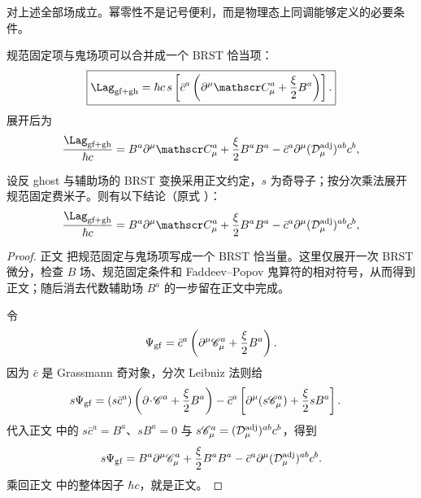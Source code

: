 对上述全部场成立。幂零性不是记号便利，而是物理态上同调能够定义的必要条件。

规范固定项与鬼场项可以合并成一个 BRST 恰当项：
\begin{equation}
 \boxed{
 \Lag_{\rm gf+gh}
 =\hbar c\,s\left[
 \bar c^a\left(\partial^\mu\mathscr C_\mu^a+\frac\xi2B^a\right)
 \right].}
 \label{eq:brst-exact-gf-dp11}
\end{equation}
展开后为
\begin{equation}
 \frac{\Lag_{\rm gf+gh}}{\hbar c}
 =B^a\partial^\mu\mathscr C_\mu^a
 +\frac\xi2B^aB^a
 -\bar c^a\partial^\mu(\mathcal D_\mu^{\rm adj})^{ab}c^b,
 \label{eq:brst-gf-expanded-dp11}
\end{equation}

\begin{proposition}
设反 ghost 与辅助场的 BRST 变换采用正文约定，$s$ 为奇导子；按分次乘法展开规范固定费米子。则有以下结论（原式 ）：
\begin{equation*}
 \frac{\Lag_{\rm gf+gh}}{\hbar c}
 =B^a\partial^\mu\mathscr C_\mu^a
 +\frac\xi2B^aB^a
 -\bar c^a\partial^\mu(\mathcal D_\mu^{\rm adj})^{ab}c^b,
\end{equation*}
\end{proposition}
\begin{proof}
正文 把规范固定与鬼场项写成一个 BRST 恰当量。这里仅展开一次 BRST 微分，检查 $B$ 场、规范固定条件和 Faddeev--Popov 鬼算符的相对符号，从而得到正文；随后消去代数辅助场 $B^a$ 的一步留在正文中完成。

令
\begin{equation*}
 \Psi_{\rm gf}
 =\bar c^a\left(\partial^\mu\mathscr C_\mu^a+\frac\xi2B^a\right).
\end{equation*}
因为 $\bar c$ 是 Grassmann 奇对象，分次 Leibniz 法则给
\begin{align*}
 s\Psi_{\rm gf}
 ={}&(s\bar c^a)
 \left(\partial\!\cdot\!\mathscr C^a+\frac\xi2B^a\right)
 -\bar c^a\left[
 \partial^\mu(s\mathscr C_\mu^a)+\frac\xi2sB^a
 \right].
\end{align*}
代入正文 中的
$s\bar c^a=B^a$、$sB^a=0$ 与
$s\mathscr C_\mu^a=(\mathcal D_\mu^{\rm adj})^{ab}c^b$，得到
\begin{equation*}
 s\Psi_{\rm gf}
 =B^a\partial^\mu\mathscr C_\mu^a
 +\frac\xi2B^aB^a
 -\bar c^a\partial^\mu(\mathcal D_\mu^{\rm adj})^{ab}c^b.
\end{equation*}
乘回正文 中的整体因子 $\hbar c$，就是正文。
\end{proof}


